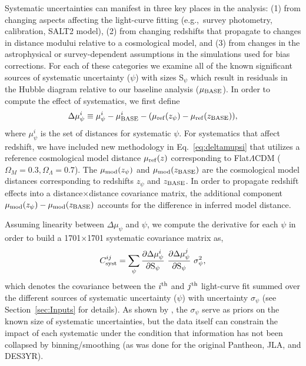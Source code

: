 \documentclass[twocolumn]{aastex63}
\begin{document}
Systematic uncertainties can manifest in three key places in the analysis: (1) from changing aspects affecting the light-curve fitting (e.g.,~survey photometry, calibration, SALT2 model), (2) from changing redshifts that propagate to changes in distance modului relative to a cosmological model, and (3) from changes in the astrophysical or survey-dependent assumptions in the simulations used for bias corrections. For each of these categories we examine all of the known significant sources of systematic uncertainty ($\psi$) with sizes S$_\psi$ which result in residuals in the Hubble diagram relative to our baseline analysis ($\mu_{\rm BASE}$).  In order to compute the effect of systematics, we first define
\begin{equation}
\label{eq:deltamupsi}
\Delta\mu^i_\psi \equiv \mu^i_\psi - \mu^i_{\rm BASE} - ( \mu_{\rm ref}(z_\psi)-\mu_{\rm ref}(z_{\rm BASE}) ) ,
\end{equation} 
where $\mu^i_\psi$ is the set of distances for systematic $\psi$. For systematics that affect redshift, we have included new methodology in Eq.~\ref{eq:deltamupsi} that utilizes a reference cosmological model distance $\mu_{\rm ref}(z)$ corresponding to Flat$\Lambda$CDM ($\Omega_M=0.3, \Omega_\Lambda=0.7$). The $\mu_{\rm mod}(z_\psi)$ and $\mu_{\rm mod}(z_{\rm BASE})$ are the cosmological model distances corresponding to redshifts $z_\psi$ and $z_{\rm BASE}$. In order to propagate redshift effects into a distance$\times$distance covariance matrix, the additional component $\mu_{\rm mod}(z_\psi)-\mu_{\rm mod}(z_{\rm BASE})$ accounts for the difference in inferred model distance. 

Assuming linearity between $\Delta\mu_\psi$ and $\psi$, we compute the derivative for each $\psi$ in order to build a 1701$\times$1701 systematic covariance matrix as,
\begin{equation}
\label{eq:csys}
C^{ij}_{\rm syst} = \sum_{\psi} \frac{\partial \Delta\mu^i_\psi}{\partial {\rm S}_\psi} ~ \frac{\partial \Delta\mu^j_\psi}{\partial {\rm S}_\psi} ~ \sigma_\psi^2,
\end{equation}
which denotes the covariance between the $i^{\rm th}$ and $j^{\rm th}$ {light-curve fit} summed over the different sources of systematic uncertainty ($\psi$) with uncertainty $\sigma_\psi$ (see Section~\ref{sec:Inputs} for details). As shown by \cite{binning21}, the $\sigma_\psi$ serve as priors on the known size of systematic uncertainties, but the data itself can constrain the impact of each systematic under the condition that information has not been collapsed by binning/smoothing (as was done for  the original Pantheon, JLA, and DES3YR). 
\end{document}

